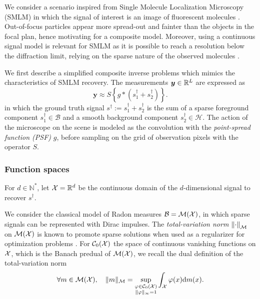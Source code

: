 \documentclass[12pt]{article}
\begin{document}
        We consider a scenario inspired from Single Molecule Localization Microscopy (SMLM) in which the signal of interest is an image of fluorescent molecules \cite{sage2019smlm}. Out-of-focus particles appear more spread-out and fainter than the objects in the focal plan, hence motivating for a composite model. Moreover, using a continuous signal model is relevant for SMLM as it is possible to reach a resolution below the diffraction limit, relying on the sparse nature of the observed molecules \cite{huang2017super,denoyelle2019sliding,laville2021sparse}.


        We first describe a simplified composite inverse problems which mimics the characteristics of SMLM recovery. The measurements $\bm{y}\in\mathbb{R}^L$ are expressed as
        \begin{equation*}
            \bm{y} \approx S \left\{g * (s_1^\dagger + s_2^\dagger)\right\}.
        \end{equation*}
        in which the ground truth signal $s^\dagger := s_1^\dagger + s_2^\dagger$ is the sum of a sparse foreground component $s_1^\dagger \in \mathcal{B}$ and a smooth background component $s_2^\dagger \in \mathcal{H}$. The action of the microscope on the scene is modeled as the convolution with the \emph{point-spread function (PSF)} $g$, before sampling on the grid of observation pixels with the operator $S$.


        \subsubsection{Function spaces}
            For $d \in \mathbb{N}^*$, let $\mathcal{X} = \mathbb{R}^d$ be the continuous domain of the $d$-dimensional signal to recover $s^\dagger$. 

            We consider the classical model of Radon measures $\mathcal{B} = {\mathcal{M}}({\mathcal{X}})$, in which sparse signals can be represented with Dirac impulses. The \textit{total-variation norm} $\left\lVert\cdot\right\rVert_\mathcal{M}$ on ${\mathcal{M}}({\mathcal{X}})$ is known to promote sparse solutions when used as a regularizer for optimization problems \cite{unser2017splines}. For ${\mathcal{C}}_0({\mathcal{X}})$ the space of continuous vanishing functions on $\mathcal{X}$, which is the Banach predual of ${\mathcal{M}}({\mathcal{X}})$, we recall the dual definition of the total-variation norm
            \begin{equation*}
                \forall m \in {\mathcal{M}}({\mathcal{X}}), \quad \lVert m \rVert_\mathcal{M} = \underset{\substack{\varphi \in {\mathcal{C}}_0({\mathcal{X}}) \\ \| \varphi \|_\infty = 1}}{\sup} \int_{\mathcal{X}} \varphi(x) \mathrm{d}m(x).
            \end{equation*}
            
\end{document}
